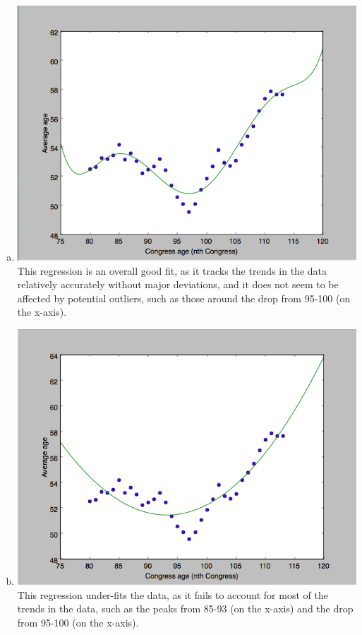 \documentclass[submit]{harvardml}
\begin{document}
\begin{enumerate}[(a)]
	\item \includegraphics[scale = 0.3]{./a} \\
		This regression is an overall good fit, as it tracks the trends in the data relatively accurately without 
		major deviations, and it does not seem to be affected by potential outliers, such as those around 
		the drop from 95-100 (on the x-axis).
	\item \includegraphics[scale = 0.3]{./b} \\
		This regression under-fits the data, as it fails to account for most of the trends in the data, such as the 
		peaks from 85-93 (on the x-axis) and the drop from 95-100 (on the x-axis).

\end{enumerate}
\end{document}
